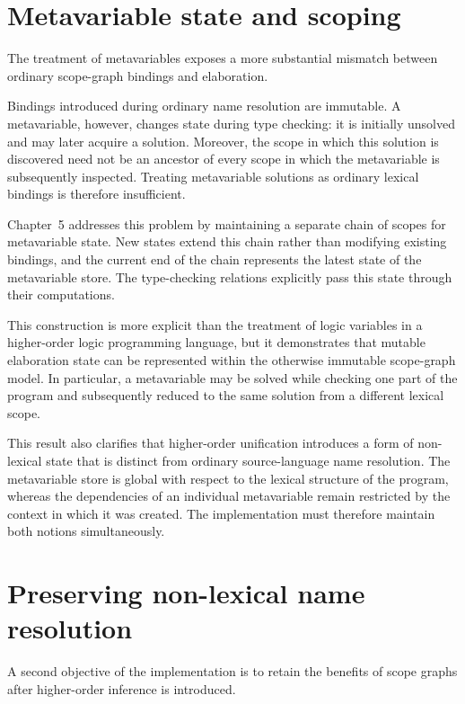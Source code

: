 \section{Metavariable state and scoping}
\label{sec:evaluation-metavariables}

The treatment of metavariables exposes a more substantial mismatch between
ordinary scope-graph bindings and elaboration.

Bindings introduced during ordinary name resolution are immutable. A
metavariable, however, changes state during type checking: it is initially
unsolved and may later acquire a solution. Moreover, the scope in which this
solution is discovered need not be an ancestor of every scope in which the
metavariable is subsequently inspected. Treating metavariable solutions as
ordinary lexical bindings is therefore insufficient.

Chapter~5 addresses this problem by maintaining a separate chain of scopes for
metavariable state. New states extend this chain rather than modifying
existing bindings, and the current end of the chain represents the latest
state of the metavariable store. The type-checking relations explicitly pass
this state through their computations.

This construction is more explicit than the treatment of logic variables in a
higher-order logic programming language, but it demonstrates that mutable
elaboration state can be represented within the otherwise immutable
scope-graph model. In particular, a metavariable may be solved while checking
one part of the program and subsequently reduced to the same solution from a
different lexical scope.

This result also clarifies that higher-order unification introduces a form of
non-lexical state that is distinct from ordinary source-language name
resolution. The metavariable store is global with respect to the lexical
structure of the program, whereas the dependencies of an individual
metavariable remain restricted by the context in which it was created. The
implementation must therefore maintain both notions simultaneously.

\section{Preserving non-lexical name resolution}
\label{sec:evaluation-nonlexical}

A second objective of the implementation is to retain the benefits of scope
graphs after higher-order inference is introduced.

